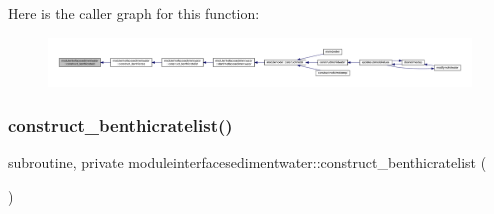 Here is the caller graph for this function\+:\nopagebreak
\begin{figure}[H]
\begin{center}
\leavevmode
\includegraphics[width=350pt]{namespacemoduleinterfacesedimentwater_a079a9bc42bec35aabbd6e236c075228e_icgraph}
\end{center}
\end{figure}
\mbox{\label{namespacemoduleinterfacesedimentwater_a4713df4000135a16a6b464063f75fe72}} 
\subsubsection{\texorpdfstring{construct\+\_\+benthicratelist()}{construct\_benthicratelist()}}
{\footnotesize\ttfamily subroutine, private moduleinterfacesedimentwater\+::construct\+\_\+benthicratelist (\begin{DoxyParamCaption}{ }\end{DoxyParamCaption})\hspace{0.3cm}{\ttfamily [private]}}

